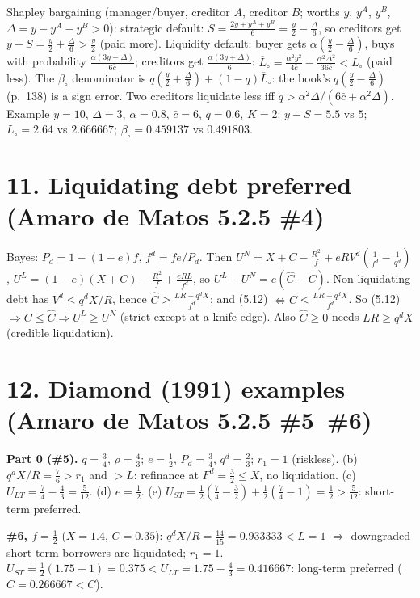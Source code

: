\documentclass[11pt,a4paper]{article}
\begin{document}
Shapley bargaining (manager/buyer, creditor $A$, creditor $B$; worths $y$, $y^A$, $y^B$, $\Delta=y-y^A-y^B>0$):
strategic default: $S=\frac{2y+y^A+y^B}{6}=\frac y2-\frac\Delta6$, so creditors get $y-S=\frac y2+\frac\Delta6>\frac y2$ (paid more).
Liquidity default: buyer gets $\alpha(\frac y2-\frac\Delta6)$, buys with probability $\frac{\alpha(3y-\Delta)}{6\bar c}$; creditors get $\frac{\alpha(3y+\Delta)}{6}$:
$\overline L_\circ=\frac{\alpha^2y^2}{4\bar c}-\frac{\alpha^2\Delta^2}{36\bar c}<L_\circ$ (paid less).
The $\beta_\circ$ denominator is $q(\frac y2+\frac\Delta6)+(1-q)\overline L_\circ$: the book's $q(\frac y2-\frac\Delta6)$ (p.~138) is a sign error.
Two creditors liquidate less iff $q>\alpha^2\Delta/(6\bar c+\alpha^2\Delta)$.
Example $y=10$, $\Delta=3$, $\alpha=0.8$, $\bar c=6$, $q=0.6$, $K=2$: $y-S=5.5$ vs $5$; $\overline L_\circ=2.64$ vs $2.666667$; $\beta_\circ=0.459137$ vs $0.491803$.

\section*{11. Liquidating debt preferred (Amaro de Matos 5.2.5 \#4)}

Bayes: $P_d=1-(1-e)f$, $f^d=fe/P_d$. Then $U^N=X+C-\frac{R^2}{f}+eRV^d(\frac1{f^d}-\frac1{q^d})$, $U^L=(1-e)(X+C)-\frac{R^2}{f}+\frac{eRL}{f^d}$,
so $U^L-U^N=e(\widehat C-C)$. Non-liquidating debt has $V^d\le q^dX/R$, hence $\widehat C\ge\frac{LR-q^dX}{f^d}$; and (5.12) $\iff C\le\frac{LR-q^dX}{f^d}$.
So (5.12) $\Rightarrow C\le\widehat C\Rightarrow U^L\ge U^N$ (strict except at a knife-edge). Also $\widehat C\ge0$ needs $LR\ge q^dX$ (credible liquidation).

\section*{12. Diamond (1991) examples (Amaro de Matos 5.2.5 \#5--\#6)}

\textbf{Part 0 (\#5).} $q=\frac34$, $\rho=\frac43$; $e=\frac12$, $P_d=\frac34$, $q^d=\frac23$; $r_1=1$ (riskless). (b) $q^dX/R=\frac76>r_1$ and $>L$: refinance at $F^d=\frac32\le X$, no liquidation.
(c) $U_{LT}=\frac74-\frac43=\frac5{12}$. (d) $e=\frac12$. (e) $U_{ST}=\frac12(\frac74-\frac32)+\frac12(\frac74-1)=\frac12>\frac5{12}$: short-term preferred.

\textbf{\#6, $f=\frac12$} ($X=1.4$, $C=0.35$): $q^dX/R=\frac{14}{15}=0.933333<L=1$ $\Rightarrow$ downgraded short-term borrowers are liquidated; $r_1=1$.
$U_{ST}=\frac12(1.75-1)=0.375<U_{LT}=1.75-\frac43=0.416667$: long-term preferred ($\widehat C=0.266667<C$).
\end{document}
